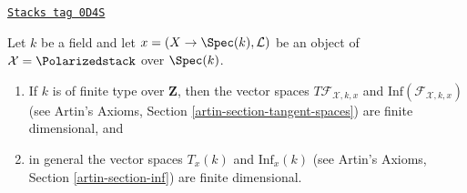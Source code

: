 \begin{lemma}
\label{quot-lemma-polarized-tangent-space}
\href{https://stacks.math.columbia.edu/tag/0D4S}{\texttt{Stacks tag 0D4S}}

Let $k$ be a field and let $x = (X \to \Spec(k), \mathcal{L})$
be an object of $\mathcal{X} = \Polarizedstack$ over $\Spec(k)$.
\begin{enumerate}
\item If $k$ is of finite type over $\mathbf{Z}$, then
the vector spaces $T\mathcal{F}_{\mathcal{X}, k, x}$ and
$\text{Inf}(\mathcal{F}_{\mathcal{X}, k, x})$
(see Artin's Axioms, Section \ref{artin-section-tangent-spaces})
are finite dimensional, and
\item in general the vector spaces $T_x(k)$ and $\text{Inf}_x(k)$
(see Artin's Axioms, Section \ref{artin-section-inf})
are finite dimensional.
\end{enumerate}
\end{lemma}

